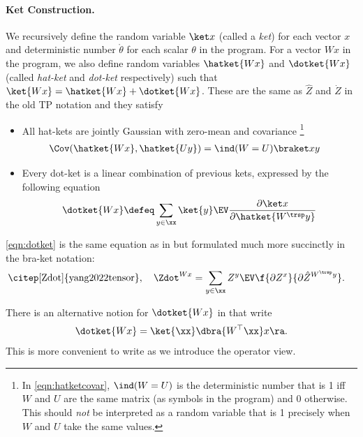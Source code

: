 \paragraph{Ket Construction.}
We recursively define the random variable $\ket x$ (called a \emph{ket}) for each vector $x$ and deterministic number $\mathring{\theta}$ for each scalar $\theta$ in the program.
For a vector $Wx$ in the program, we also define random variables $\hatket{Wx}$ and $\dotket{Wx}$ (called \emph{hat-ket} and \emph{dot-ket} respectively) such that $\ket{Wx} = \hatket{Wx} + \dotket{Wx}$. These are the same as $\hat{Z}$ and $\dot{Z}$ in the old TP notation \citep{yang2022tensor} and they satisfy
\begin{itemize}

\item[\texttt{Hat}]
All hat-kets
are jointly Gaussian with zero-mean and covariance%
\footnote{In \cref{eqn:hatketcovar}, $\ind(W=U)$ is the deterministic number that is 1 iff $W$ and $U$ are the same matrix (as symbols in the program) and 0 otherwise. This should \emph{not} be interpreted as a random variable that is 1 precisely when $W$ and $U$ take the same values.}
\begin{align}
  \Cov(\hatket{Wx}, \hatket{Uy}) &= \ind(W = U)\braket x y \label{eqn:hatketcovar}
\end{align}

\item[\texttt{Dot}] Every dot-ket is a linear combination of previous kets, expressed by the following equation
\begin{equation}
  \dotket{Wx}\defeq \sum_{y \in \xx} \ket{y}\EV \frac{\partial \ket x}{\partial \hatket{W^\trsp y}}\label{eqn:dotket}
\end{equation}
\end{itemize}
\cref{eqn:dotket} is the same equation as in\citep[Zdot]{yang2022tensor} 
but formulated much more succinctly in the bra-ket notation:
\begin{align*}
  \text{\citep[Zdot]{yang2022tensor}},\quad
  \Zdot^{Wx}
  &= \sum_{y \in \xx } Z^{y}\EV \f{\partial Z^x} {\partial \hat Z^{W^\trsp y}}.
\end{align*}

\newcommand\lhatbra[1]{\mkern+3mu\check{\mkern-3mu\langle}#1 \ob}
\newcommand\lhatbraket[2]{\mkern+3mu\check{\mkern-3mu\langle}#1 \ob #2 \rangle}

There is an alternative notion for $\dotket{Wx}$ in \citet{yang2023tensor} that write 
\[\dotket{Wx}=\ket{\xx}\dbra{W^\top \xx}x\ra.\] This is more convenient to write as we introduce the operator view.

